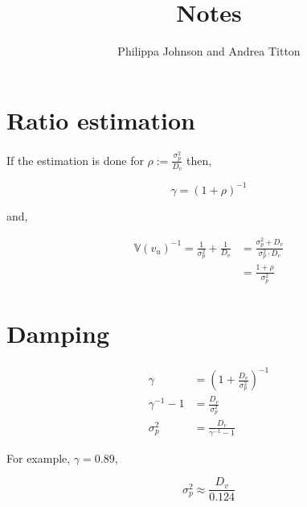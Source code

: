 \documentclass[american]{scrartcl}
\title{Notes}
\author{Philippa Johnson and Andrea Titton}
\newcommand{\V}{\mathbb{V}}
\begin{document}
\maketitle

\section{Ratio estimation}

If the estimation is done for $\rho :=  \frac{\sigma^2_p}{D_v}$ then,

\begin{equation}
    \gamma = \left( 1 + \rho \right)^{-1}
\end{equation}

and,

\begin{equation}
    \begin{split}
        \V(v_u)^{-1} = \frac{1}{\sigma^2_p} + \frac{1}{D_v} &= \frac{\sigma^2_p + D_v}{\sigma^2_p \cdot D_v} \\
        &= \frac{1 + \rho}{\sigma^2_p}
    \end{split}
\end{equation}


\section{Damping}

\begin{equation}
    \begin{split}
        \gamma &= \left(1 + \frac{D_v}{\sigma^2_p}\right)^{-1} \\
        \gamma^{-1} - 1 &= \frac{D_v}{\sigma^2_p} \\
        \sigma^2_p &= \frac{D_v}{\gamma^{-1} - 1}
    \end{split}
\end{equation}

For example, $\gamma = 0.89$,

\begin{equation}
    \sigma^2_p \approx \frac{D_v}{0.124}
\end{equation}
\end{document}
